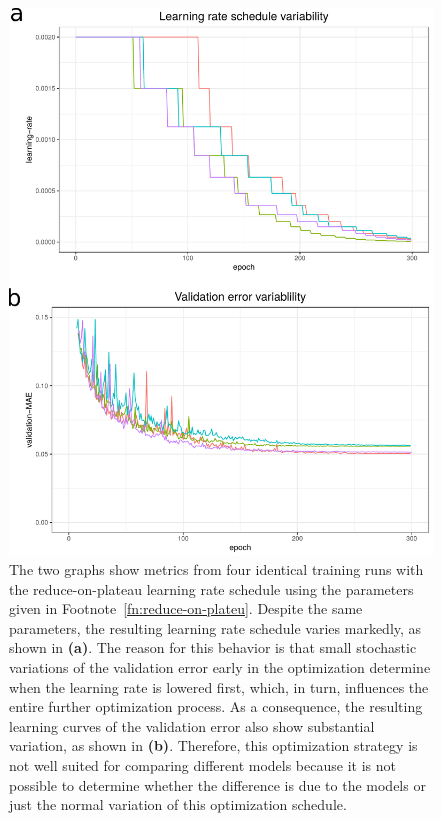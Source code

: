 \begin{figure}[H]
	\includegraphics[width=0.9\linewidth]{figures/optimization-variabiliy}
	
	\caption{The two graphs show metrics from four identical training runs with the reduce-on-plateau learning rate schedule using the parameters given in Footnote~\ref{fn:reduce-on-plateu}. Despite the same parameters, the resulting learning rate schedule varies markedly, as shown in \textbf{(a)}. The reason for this behavior is that small stochastic variations of the validation error early in the optimization determine when the learning rate is lowered first, which, in turn, influences the entire further optimization process. As a consequence, the resulting learning curves of the validation error also show substantial variation, as shown in \textbf{(b)}. Therefore, this optimization strategy is not well suited for comparing different models because it is not possible to determine whether the difference is due to the models or just the normal variation of this optimization schedule.}
	\label{fig:optimization-variablility}
\end{figure}

 
